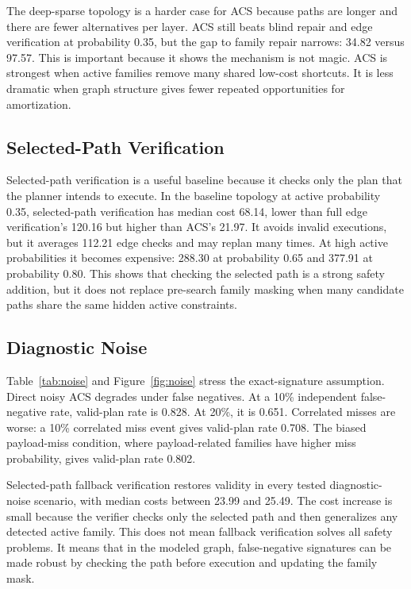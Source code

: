 \documentclass{article}
\newcommand{\ACS}{\textsc{ACS}}
\begin{document}
The deep-sparse topology is a harder case for \ACS{} because paths are longer and there are fewer alternatives per layer. \ACS{} still beats blind repair and edge verification at probability 0.35, but the gap to family repair narrows: 34.82 versus 97.57. This is important because it shows the mechanism is not magic. \ACS{} is strongest when active families remove many shared low-cost shortcuts. It is less dramatic when graph structure gives fewer repeated opportunities for amortization.

\subsection{Selected-Path Verification}

Selected-path verification is a useful baseline because it checks only the plan that the planner intends to execute. In the baseline topology at active probability 0.35, selected-path verification has median cost 68.14, lower than full edge verification's 120.16 but higher than \ACS{}'s 21.97. It avoids invalid executions, but it averages 112.21 edge checks and may replan many times. At high active probabilities it becomes expensive: 288.30 at probability 0.65 and 377.91 at probability 0.80. This shows that checking the selected path is a strong safety addition, but it does not replace pre-search family masking when many candidate paths share the same hidden active constraints.

\subsection{Diagnostic Noise}

Table~\ref{tab:noise} and Figure~\ref{fig:noise} stress the exact-signature assumption. Direct noisy \ACS{} degrades under false negatives. At a 10\% independent false-negative rate, valid-plan rate is 0.828. At 20\%, it is 0.651. Correlated misses are worse: a 10\% correlated miss event gives valid-plan rate 0.708. The biased payload-miss condition, where payload-related families have higher miss probability, gives valid-plan rate 0.802.

Selected-path fallback verification restores validity in every tested diagnostic-noise scenario, with median costs between 23.99 and 25.49. The cost increase is small because the verifier checks only the selected path and then generalizes any detected active family. This does not mean fallback verification solves all safety problems. It means that in the modeled graph, false-negative signatures can be made robust by checking the path before execution and updating the family mask.
\end{document}
